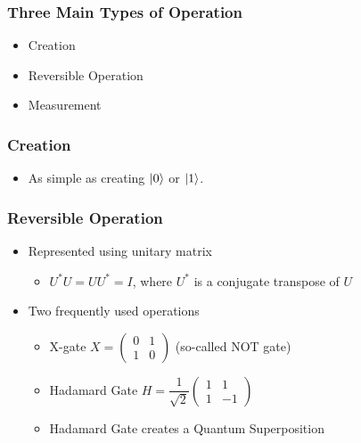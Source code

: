 \documentclass{beamer}
\begin{document}
	\begin{frame}
		\frametitle{Three Main Types of Operation}
		\begin{itemize}
			\item Creation
			\item Reversible Operation
			\item Measurement
		\end{itemize}
	\end{frame}
	
	\begin{frame}
		\frametitle{Creation}
		\begin{itemize}
			\item As simple as creating $\ket{0}$ or $\ket{1}$.
		\end{itemize}
	\end{frame}
	
	\begin{frame}
		\frametitle{Reversible Operation}
		\begin{itemize}
			\item Represented using unitary matrix
			\begin{itemize}
				\item $U^*U=UU^*=I$, where $U^*$ is a conjugate transpose of $U$
			\end{itemize}
			\item Two frequently used operations
			\begin{itemize}
				\item X-gate $X=\begin{pmatrix} 0 & 1 \\ 1 & 0 \end{pmatrix}$ (so-called NOT gate)
				\item Hadamard Gate $H=\dfrac{1}{\sqrt{2}}\begin{pmatrix} 1 & 1 \\ 1 & -1 \end{pmatrix}$
				\item Hadamard Gate creates a Quantum Superposition
			\end{itemize}
		\end{itemize}
	\end{frame}
	
\end{document}
